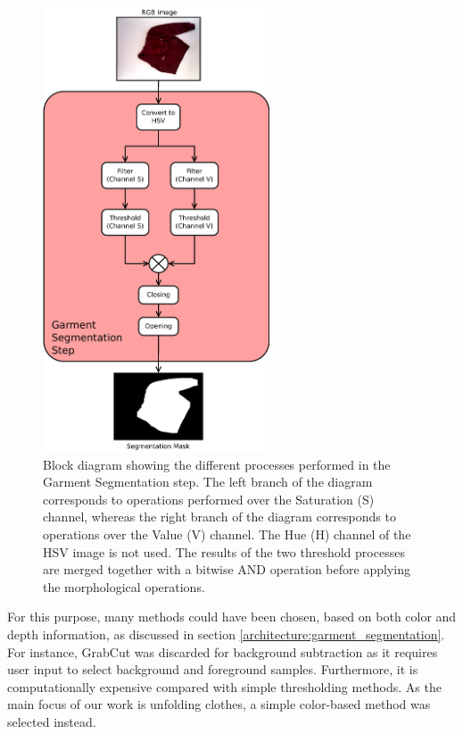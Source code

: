 \begin{figure}[thpb]
    \centering
    \includegraphics[width=0.6\textwidth]
    {figures/Garment-segmentation-process-diagram.pdf}
    \caption{Block diagram showing the different processes performed in the Garment Segmentation step. The left branch of the diagram corresponds to operations performed over the Saturation (S) channel, whereas the right branch of the diagram corresponds to operations over the Value (V) channel. The Hue (H) channel of the HSV image is not used. The results of the two threshold processes are merged together with a bitwise AND operation before applying the morphological operations.}
    \label{fig:background_subtration_processes}
\end{figure}

For this purpose, many methods could have been chosen, based on both color and depth information, as discussed in section \ref{architecture:garment_segmentation}. For instance, GrabCut \cite{rother2004grabcut} was discarded for background subtraction as it requires user input to select background and foreground samples. Furthermore, it is computationally expensive compared with simple thresholding methods. As the main focus of our work is unfolding clothes, a simple color-based method was selected instead. 


